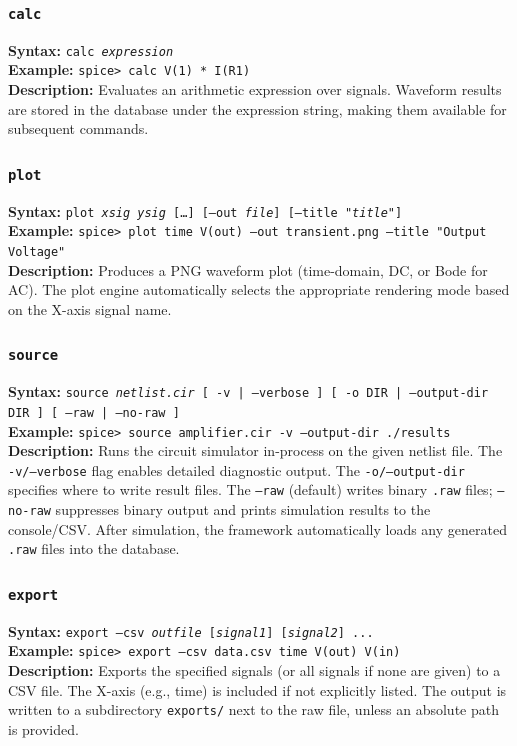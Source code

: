 \subsubsection{\texttt{calc}}
\textbf{Syntax:} \texttt{calc \textit{expression}}\\
\textbf{Example:} \texttt{spice> calc V(1) * I(R1)}\\
\textbf{Description:} Evaluates an arithmetic expression over signals. Waveform results are stored in the database under the expression string, making them available for subsequent commands.

\subsubsection{\texttt{plot}}
\textbf{Syntax:} \texttt{plot \textit{xsig} \textit{ysig} [\ldots] [--out \textit{file}] [--title \textit{"title"}]}\\
\textbf{Example:} \texttt{spice> plot time V(out) --out transient.png --title "Output Voltage"}\\
\textbf{Description:} Produces a PNG waveform plot (time-domain, DC, or Bode for AC). The plot engine automatically selects the appropriate rendering mode based on the X-axis signal name.

\subsubsection{\texttt{source}}
\textbf{Syntax:} \texttt{source \textit{netlist.cir} [ -v | --verbose ] [ -o DIR | --output-dir DIR ] [ --raw | --no-raw ]}\\
\textbf{Example:} \texttt{spice> source amplifier.cir -v --output-dir ./results}\\
\textbf{Description:} Runs the circuit simulator in-process on the given netlist file. The \texttt{-v/--verbose} flag enables detailed diagnostic output. The \texttt{-o/--output-dir} specifies where to write result files. The \texttt{--raw} (default) writes binary \texttt{.raw} files; \texttt{--no-raw} suppresses binary output and prints simulation results to the console/CSV. After simulation, the framework automatically loads any generated \texttt{.raw} files into the database.

\subsubsection{\texttt{export}}
\textbf{Syntax:} \texttt{export --csv \textit{outfile} [\textit{signal1}] [\textit{signal2}] ...}\\
\textbf{Example:} \texttt{spice> export --csv data.csv time V(out) V(in)}\\
\textbf{Description:} Exports the specified signals (or all signals if none are given) to a CSV file. The X-axis (e.g., time) is included if not explicitly listed. The output is written to a subdirectory \texttt{exports/} next to the raw file, unless an absolute path is provided.


